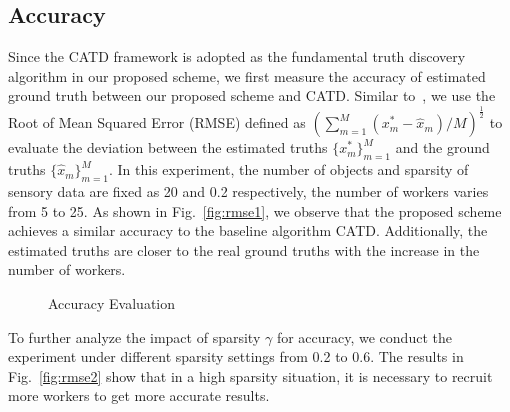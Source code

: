 \documentclass[conference]{IEEEtran}
\begin{document}
\subsection{Accuracy}
Since the CATD framework is adopted as the fundamental truth discovery algorithm in our proposed scheme, we first measure the accuracy of estimated ground truth between our proposed scheme and CATD.
Similar to~\cite{zhang_reliable_2019,xue_inpptd_2020}, we use the Root of Mean Squared Error (RMSE) defined as $(\sum_{m=1}^M (x_m^* - \hat{x}_m)/M)^{\frac{1}{2}}$ to evaluate the deviation between the estimated truths $\{x_m^*\}_{m=1}^M$ and the ground truths $\{\hat{x}_m\}_{m=1}^M$.
In this experiment, the number of objects and sparsity of sensory data are fixed as 20 and 0.2 respectively, the number of workers varies from 5 to 25.
As shown in Fig.~\ref{fig:rmse1}, we observe that the proposed scheme achieves a similar accuracy to the baseline algorithm CATD.
Additionally, the estimated truths are closer to the real ground truths with the increase in the number of workers.
\begin{figure}[htbp]
  \centering 
  \caption{Accuracy Evaluation}
  \label{fig:rmse} 
\end{figure}
To further analyze the impact of sparsity $\gamma$ for accuracy, we conduct the experiment under different sparsity settings from 0.2 to 0.6.
The results in Fig.~\ref{fig:rmse2} show that in a high sparsity situation, it is necessary to recruit more workers to get more accurate results.
\end{document}
